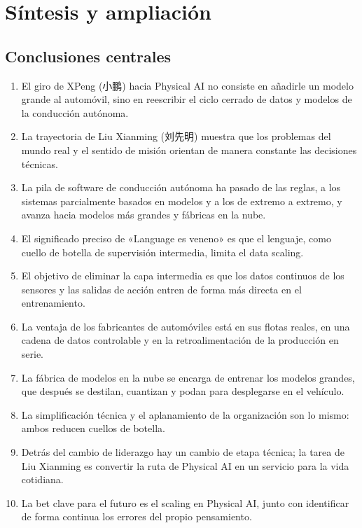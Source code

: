 \section{Síntesis y ampliación}

\subsection{Conclusiones centrales}

\begin{enumerate}
\item El giro de XPeng (小鹏) hacia Physical AI no consiste en añadirle un modelo grande al automóvil, sino en reescribir el ciclo cerrado de datos y modelos de la conducción autónoma.
\item La trayectoria de Liu Xianming (刘先明) muestra que los problemas del mundo real y el sentido de misión orientan de manera constante las decisiones técnicas.
\item La pila de software de conducción autónoma ha pasado de las reglas, a los sistemas parcialmente basados en modelos y a los de extremo a extremo, y avanza hacia modelos más grandes y fábricas en la nube.
\item El significado preciso de «Language es veneno» es que el lenguaje, como cuello de botella de supervisión intermedia, limita el data scaling.
\item El objetivo de eliminar la capa intermedia es que los datos continuos de los sensores y las salidas de acción entren de forma más directa en el entrenamiento.
\item La ventaja de los fabricantes de automóviles está en sus flotas reales, en una cadena de datos controlable y en la retroalimentación de la producción en serie.
\item La fábrica de modelos en la nube se encarga de entrenar los modelos grandes, que después se destilan, cuantizan y podan para desplegarse en el vehículo.
\item La simplificación técnica y el aplanamiento de la organización son lo mismo: ambos reducen cuellos de botella.
\item Detrás del cambio de liderazgo hay un cambio de etapa técnica; la tarea de Liu Xianming es convertir la ruta de Physical AI en un servicio para la vida cotidiana.
\item La bet clave para el futuro es el scaling en Physical AI, junto con identificar de forma continua los errores del propio pensamiento.
\end{enumerate}

